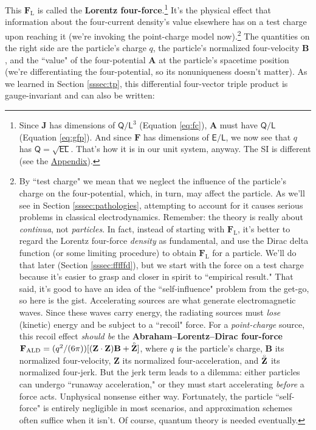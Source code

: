 \documentclass[12pt]{article}
\renewcommand{\mathring}[1]{\accentset{\circ}{#1}}
\renewcommand{\vv}[1]{\mathbf{#1}}
\begin{document}
This $\vv F_{\textrm{L}}$ is called the \textbf{Lorentz four-force}.\footnote{\label{fn:qdims}Since $\vv J$ has dimensions of $\mathsf{Q} / \mathsf{L}^3$ (Equation \ref{eq:fc}), $\vv A$ must have $\mathsf{Q} / \mathsf{L}$ (Equation \ref{eq:gfp}). And since $\vv F$ has dimensions of $\mathsf{E} / \mathsf{L}$, we now see that $q$ has $\mathsf{Q} = \sqrt{\mathsf{E}\mathsf{L}}$. That's how it is in our unit system, anyway. The SI is different (see the \hyperref[sec:appendix]{Appendix}).} It's the physical effect that information about the four-current density's value elsewhere has on a test charge upon reaching it (we're invoking the point-charge model now).\footnote{\label{fn:recoil}By ``test charge" we mean that we neglect the influence of the particle's charge on the four-potential, which, in turn, may affect the particle. As we'll see in Section \ref{sssec:pathologies}, attempting to account for it causes serious problems in classical electrodynamics. Remember: the theory is really about \emph{continua}, not \emph{particles}. In fact, instead of starting with $\vv F_{\textrm{L}}$, it's better to regard the Lorentz four-force \emph{density} as fundamental, and use the Dirac delta function (or some limiting procedure) to obtain $\vv F_{\textrm{L}}$ for a particle. We'll do that later (Section \ref{sssec:fffffd}), but we start with the force on a test charge because it's easier to grasp and closer in spirit to ``empirical result." That said, it's good to have an idea of the ``self-influence" problem from the get-go, so here is the gist. Accelerating sources are what generate electromagnetic waves. Since these waves carry energy, the radiating sources must \emph{lose} (kinetic) energy and be subject to a ``recoil" force. For a \emph{point-charge} source, this recoil effect \emph{should be} the \textbf{Abraham--Lorentz--Dirac four-force} ${\vv F_{\textrm{ALD}} = (q^2 / (6 \pi))[(\vv Z \cdot \vv Z) \vv B + \mathring{\vv Z}]}$, where $q$ is the particle's charge, $\vv B$ its normalized four-velocity, $\vv Z$ its normalized four-acceleration, and $\mathring{\vv Z}$ its normalized four-jerk. But the jerk term leads to a dilemma: either particles can undergo ``runaway acceleration," or they must start accelerating \emph{before} a force acts. Unphysical nonsense either way. Fortunately, the particle ``self-force" is entirely negligible in most scenarios, and approximation schemes often suffice when it isn't. Of course, quantum theory is needed eventually.} The quantities on the right side are the particle's charge $q$, the particle's normalized four-velocity $\vv B$, and the ``value" of the four-potential $\vv A$ at the particle's spacetime position (we're differentiating the four-potential, so its nonuniqueness doesn't matter). As we learned in Section \ref{sssec:tp}, this differential four-vector triple product is gauge-invariant and can also be written:
\end{document}
